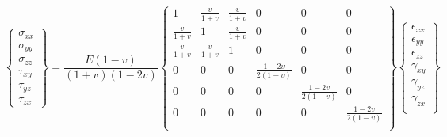 \documentclass[11pt]{article}
\numberwithin{equation}{section}
\begin{document}
\begin{equation}
    \begin{Bmatrix}
        \sigma_{xx} \\
        \sigma_{yy} \\
        \sigma_{zz} \\
        \tau_{xy}   \\
        \tau_{yz}   \\
        \tau_{zx}
    \end{Bmatrix} = \frac{E\left(1-v\right)}{\left(1+v\right)\left(1-2v\right)}
    \begin{Bmatrix}
        1             & \frac{v}{1+v} & \frac{v}{1+v} & 0                   & 0                   & 0                   \\
        \frac{v}{1+v} & 1             & \frac{v}{1+v} & 0                   & 0                   & 0                   \\
        \frac{v}{1+v} & \frac{v}{1+v} & 1             & 0                   & 0                   & 0                   \\
        0             & 0             & 0             & \frac{1-2v}{2(1-v)} & 0                   & 0                   \\
        0             & 0             & 0             & 0                   & \frac{1-2v}{2(1-v)} & 0                   \\
        0             & 0             & 0             & 0                   & 0                   & \frac{1-2v}{2(1-v)} \\
    \end{Bmatrix}
    \begin{Bmatrix}
        \epsilon_{xx} \\
        \epsilon_{yy} \\
        \epsilon_{zz} \\
        \gamma_{xy}   \\
        \gamma_{yz}   \\
        \gamma_{zx}   \\
    \end{Bmatrix}
\end{equation}
\end{document}
